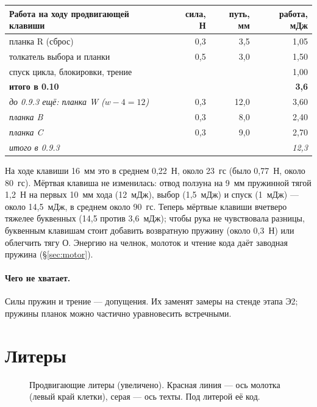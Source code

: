\begin{center}\small
\begin{tabular}{@{}lrrr@{}}
\toprule
Работа на ходу продвигающей клавиши & сила, Н & путь, мм & работа, мДж \\
\midrule
планка R (сброс) & 0,3 & 3,5 & 1,05 \\
толкатель выбора и планки & 0,5 & 3,0 & 1,50 \\
спуск цикла, блокировки, трение & & & 1,00 \\
\midrule
\textbf{итого в 0.10} & & & \textbf{3,6} \\
\midrule
\textit{до 0.9.3 ещё: планка W ($w - 4 = 12$)} & 0,3 & 12,0 & 3,60 \\
\textit{планка B} & 0,3 & 8,0 & 2,40 \\
\textit{планка C} & 0,3 & 9,0 & 2,70 \\
\textit{итого в 0.9.3} & & & \textit{12,3} \\
\bottomrule
\end{tabular}
\end{center}

На ходе клавиши 16~мм это в среднем 0,22~Н, около 23~гс (было 0,77~Н, около 80~гс). Мёртвая клавиша не изменилась: отвод ползуна на 9~мм пружинной тягой 1,2~Н на первых 10~мм хода (12~мДж), выбор (1,5~мДж) и спуск (1~мДж) — около 14,5~мДж, в среднем около 90~гс. Теперь мёртвые клавиши вчетверо тяжелее буквенных (14,5 против 3,6~мДж); чтобы рука не чувствовала разницы, буквенным клавишам стоит добавить возвратную пружину (около 0,3~Н) или облегчить тягу О. Энергию на челнок, молоток и чтение кода даёт заводная пружина (\S\ref{sec:motor}).

\paragraph{Чего не хватает.} Силы пружин и трение — допущения. Их заменят замеры на стенде этапа Э2; пружины планок можно частично уравновесить встречными.

\section{Литеры}

\begin{figure}[H]
\centering
\setlength\tgem{26mm}
\begin{tikzpicture}[x=\tgu,y=\tgu]

\end{tikzpicture}
\caption{Продвигающие литеры (увеличено). Красная линия — ось молотка (левый край клетки), серая — ось техты. Под литерой её код.}
\end{figure}

